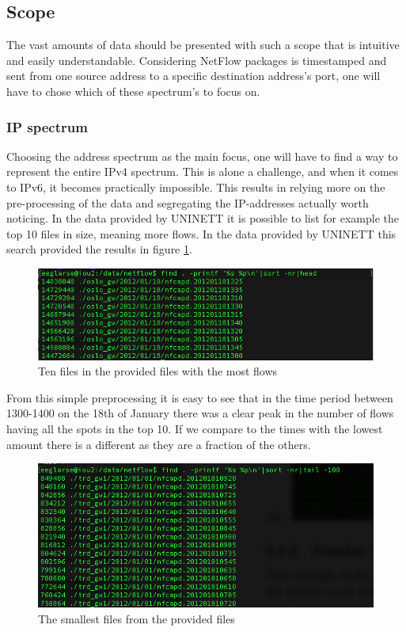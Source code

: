 \subsection{Scope}
The vast amounts of data should be presented with such a scope that is intuitive and easily understandable. Considering NetFlow packages is timestamped and sent from one source address to a specific destination address's port, one will have to chose which of these spectrum's to focus on. 

\subsubsection{IP spectrum}
Choosing the address spectrum as the main focus, one will have to find a way to represent the entire IPv4 spectrum. This is alone a challenge, and when it comes to IPv6, it becomes practically impossible. This results in relying more on the pre-processing of the data and segregating the IP-addresses actually worth noticing. In the data provided by UNINETT it is possible to list for example the top 10 files in size, meaning more flows. 
In the data provided by UNINETT this search provided the results in figure \ref{topten}.

\begin{figure}[h!]

\includegraphics[scale=0.6]{top10}
\caption{Ten files in the provided files with the most flows}
\label{topten}
\end{figure}

From this simple preprocessing it is easy to see that in the time period between 1300-1400 on the 18th of January there was a clear peak in the number of flows having all the spots in the top 10. If we compare to the times with the lowest amount there is a different as they are a fraction of the others.

\begin{figure}
\includegraphics[scale=0.6]{bottom}
\caption{The smallest files from the provided files}
\end{figure}

